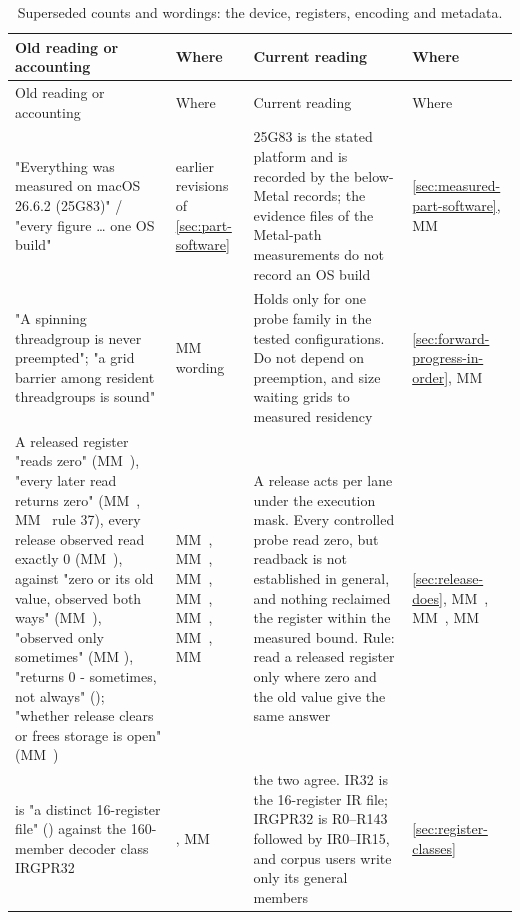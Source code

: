 \begin{xltabular}{\linewidth}{@{}>{\hsize}X>{\hsize}X>{\hsize}X>{\hsize}X@{}}
\caption{Superseded counts and wordings: the device, registers, encoding and metadata.}\label{tab:acct-device-encoding}\\
\toprule
Old reading or accounting & Where & Current reading & Where \\
\midrule
\endfirsthead
{}
\toprule
Old reading or accounting & Where & Current reading & Where \\
\midrule
\endhead
"Everything was measured on macOS 26.6.2 (25G83)" / "every figure \dots{}
one OS build" & earlier revisions of \cref{sec:part-software} & 25G83 is the stated platform and is recorded by the below-Metal records;
the evidence files of the Metal-path measurements do not record an OS
build & \cref{sec:measured-part-software}, MM~ \\
"A spinning threadgroup is never preempted"; "a grid barrier among
resident threadgroups is sound" & MM~
wording & Holds only for one probe family in the tested configurations. Do not depend on preemption, and size
waiting grids to measured residency & \cref{sec:forward-progress-in-order}, MM~ \\
A released register "reads zero" (MM~), "every later read
returns zero" (MM~, MM~ rule 37), every release observed
read exactly 0 (MM~), against "zero or its old value, observed
both ways" (MM~), "observed only sometimes" (MM
), "returns 0 - sometimes, not always"
(); "whether release clears or frees storage is open" (MM~) & MM~, MM~, MM~, MM~, MM~, MM~, MM~ & A release acts per lane under the execution mask. Every controlled probe read zero, but readback
is not established in general, and nothing reclaimed the register within the measured bound. Rule: read a released
register only where zero and the old value give the same answer & \cref{sec:release-does}, MM~, MM~, MM~ \\
 is "a distinct 16-register file"
() against the 160-member decoder
class IRGPR32 & , MM~ & the two agree. IR32 is the 16-register IR file; IRGPR32 is R0–R143
followed by IR0–IR15, and corpus users write only its general members & \cref{sec:register-classes} \\

\end{xltabular}

